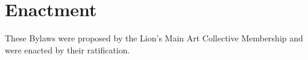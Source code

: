 \chapter{Enactment}\label{sec:enactment}
These Bylaws were proposed by the Lion's Main Art Collective Membership and were enacted \dateapproved by their ratification.
